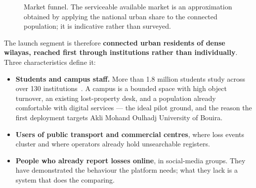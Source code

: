 \begin{figure}[htbp]
\centering
{}
\caption{Market funnel. The serviceable available market is an approximation
obtained by applying the national urban share to the connected population; it is
indicative rather than surveyed.}
\label{fig:market-funnel}
\end{figure}

The launch segment is therefore \textbf{connected urban residents of dense
wilayas, reached first through institutions rather than individually}. Three
characteristics define it:

\begin{itemize}[leftmargin=1.4em,itemsep=3pt]
  \item \textbf{Students and campus staff.} More than 1.8 million students study
        across over 130 institutions~\cite{mesrs2025}. A campus is a bounded
        space with high object turnover, an existing lost-property desk, and a
        population already comfortable with digital services --- the ideal pilot
        ground, and the reason the first deployment targets Akli Mohand Oulhadj
        University of Bouira.
  \item \textbf{Users of public transport and commercial centres}, where loss
        events cluster and where operators already hold unsearchable registers.
  \item \textbf{People who already report losses online}, in social-media
        groups. They have demonstrated the behaviour the platform needs; what
        they lack is a system that does the comparing.
\end{itemize}


